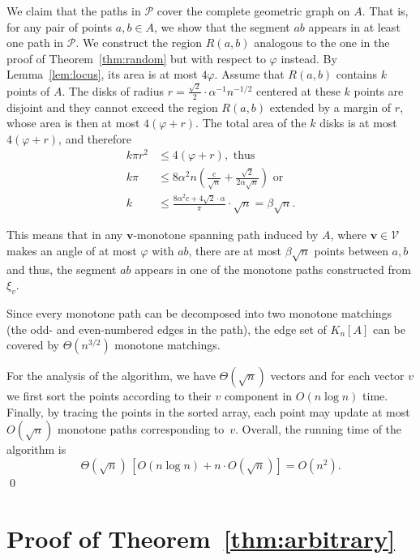 \documentclass[a4paper,USenglish]{lipics-v2021}
\def\P{\mathcal P}
\def\V{\mathcal V}
\begin{document}
We claim that the paths in $\mathcal{P}$ cover the complete geometric graph on $A$. That is, 
for any pair of points $a,b \in A$, we show that the segment $ab$ appears in at least one path in $\P$. 
We construct the region $R(a,b)$ analogous to the one in the proof of Theorem~\ref{thm:random}
but with respect to $\varphi$ instead. By Lemma~\ref{lem:locus}, its area is at most $4\varphi$.
Assume that $R(a,b)$ contains $k$ points of $A$. The disks of radius 
$r=\frac{\sqrt{2}}{2} \cdot \alpha^{-1} n^{-1/2}$
centered at these $k$ points are disjoint and they cannot exceed the region $R(a,b)$ extended by a margin of $r$, whose area is then at most $4(\varphi+r)$. The total area of the $k$ disks is at most $4(\varphi+r)$,
and therefore
%
\begin{align*}
 k\pi r^2 &\leq 4(\varphi + r), \text{ thus }\\
k\pi &\leq 8 \alpha^2 n \left(\frac{c}{\sqrt{n}} + \frac{\sqrt{2}}{2 \alpha \sqrt{n}} \right)
\text{ or } \\
k &\leq \frac{8 \alpha^2 c +4\sqrt{2} \cdot \alpha}{\pi} \cdot \sqrt{n} = \beta\sqrt{n}.
\end{align*}

This means that in any $\mathbf{v}$-monotone spanning path induced by $A$,
where $\mathbf{v} \in \V$ makes an angle of at most $\varphi$ with $ab$, 
there are at most $\beta\sqrt{n}$ points between $a,b$ and thus, 
the segment $ab$ appears in one of the monotone paths constructed from $\xi_v$.

Since every monotone path can be decomposed into two monotone matchings 
(the odd- and even-numbered edges in the path),
the edge set of  $K_n[A]$ can be covered by $\Theta(n^{3/2})$ monotone matchings.

For the analysis of the algorithm, we have $\Theta(\sqrt{n})$ vectors and  for
each vector $v$ we first sort the points according to their $v$ component in
$O(n\log n)$ time. Finally, by tracing the points in  the sorted array,
each point may update at most $O(\sqrt{n})$ monotone paths corresponding to~$v$.
Overall, the running time of the algorithm is 
\[ \Theta(\sqrt{n}) \, \left[O(n \log n) + n \cdot O(\sqrt{n}) \right ] = O(n^2). \]
\qed


\section{Proof of Theorem~\ref{thm:arbitrary}}
\end{document}

